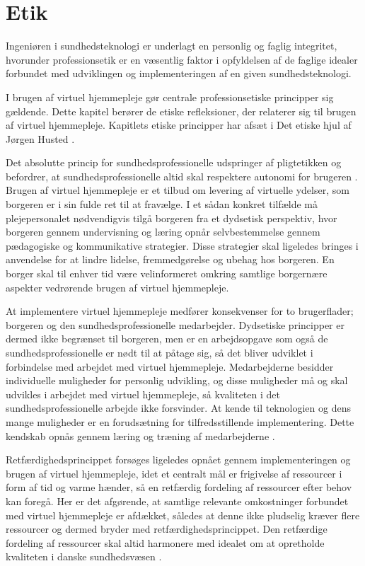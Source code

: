\chapter{Etik}
Ingeniøren i sundhedsteknologi er underlagt en personlig og faglig integritet, hvorunder professionsetik er en væsentlig faktor i opfyldelsen af de faglige idealer forbundet med udviklingen og implementeringen af en given sundhedsteknologi.  

I brugen af virtuel hjemmepleje gør centrale professionsetiske principper sig gældende. Dette kapitel berører de etiske refleksioner, der relaterer sig til brugen af virtuel hjemmepleje. Kapitlets etiske principper har afsæt i Det etiske hjul af Jørgen Husted \cite{etiskhjul}. 

Det absolutte princip for sundhedsprofessionelle udspringer af pligtetikken og befordrer, at sundhedsprofessionelle altid skal respektere autonomi for brugeren \cite{mtv}. Brugen af virtuel hjemmepleje er et tilbud om levering af virtuelle ydelser, som borgeren er i sin fulde ret til at fravælge. I et sådan konkret tilfælde må plejepersonalet nødvendigvis tilgå borgeren fra et dydsetisk perspektiv, hvor borgeren gennem undervisning og læring opnår selvbestemmelse gennem pædagogiske og kommunikative strategier. Disse strategier skal ligeledes bringes i anvendelse for at lindre lidelse, fremmedgørelse og ubehag hos borgeren. En borger skal til enhver tid være velinformeret omkring samtlige borgernære aspekter vedrørende brugen af virtuel hjemmepleje. 

At implementere virtuel hjemmepleje medfører konsekvenser for to brugerflader; borgeren og den sundhedsprofessionelle medarbejder. Dydsetiske principper er dermed ikke begrænset til borgeren, men er en arbejdsopgave som også de sundhedsprofessionelle er nødt til at påtage sig, så det bliver udviklet i forbindelse med arbejdet med virtuel hjemmepleje. Medarbejderne besidder individuelle muligheder for personlig udvikling, og disse muligheder må og skal udvikles i arbejdet med virtuel hjemmepleje, så kvaliteten i det sundhedsprofessionelle arbejde ikke forsvinder. At kende til teknologien og dens mange muligheder er en forudsætning for tilfredsstillende implementering. Dette kendskab opnås gennem læring og træning af medarbejderne \cite{mtv}. 

Retfærdighedsprincippet forsøges ligeledes opnået gennem implementeringen og brugen af virtuel hjemmepleje, idet et centralt mål er frigivelse af ressourcer i form af tid og varme hænder, så en retfærdig fordeling af ressourcer efter behov kan foregå. Her er det afgørende, at samtlige relevante omkostninger forbundet med virtuel hjemmepleje er afdækket, således at denne ikke pludselig kræver flere ressourcer og dermed bryder med retfærdighedsprincippet. Den retfærdige fordeling af ressourcer skal altid harmonere med idealet om at opretholde kvaliteten i danske sundhedsvæsen \cite{mtv}.

